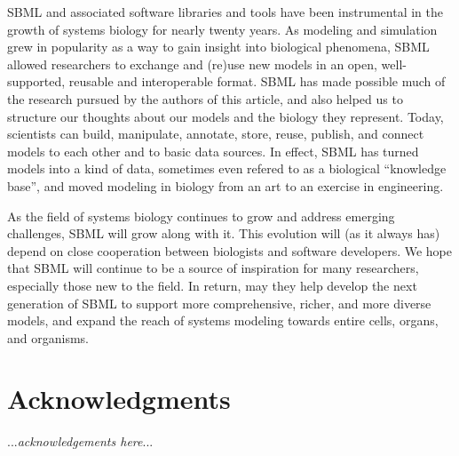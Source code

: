 \documentclass[]{draft-sbml-paper}
\begin{document}
SBML and associated software libraries and tools have been instrumental in the growth of systems biology for nearly twenty years.  As modeling and simulation grew in popularity as a way to gain insight into biological phenomena, SBML allowed researchers to exchange and (re)use new models in an open, well-supported, reusable and interoperable format. SBML has made possible much of the research pursued by the authors of this article, and also helped us to structure our thoughts about our models and the biology they represent.  Today, scientists can build, manipulate, annotate, store, reuse, publish, and connect models to each other and to basic data sources.  In effect, SBML has turned models into a kind of data, sometimes even refered to as a biological ``knowledge base'', and moved modeling in biology from an art to an exercise in engineering.

As the field of systems biology continues to grow and address emerging challenges, SBML will grow along with it.  This evolution will (as it always has) depend on close cooperation between biologists and software developers.  We hope that SBML will continue to be a source of inspiration for many researchers, especially those new to the field.  In return, may they help develop the next generation of SBML to support more comprehensive, richer, and more diverse models, and expand the reach of systems modeling towards entire cells, organs, and organisms.


\section{Acknowledgments}

...\emph{acknowledgements here}...

\clearpage



\end{document}

